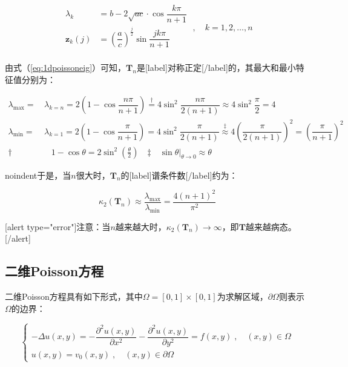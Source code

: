 \documentclass[12pt, UTF8, nofonts]{ctexart}
\begin{document}
\begin{equation*}
    \begin{aligned}
        \lambda_k &= b-2\sqrt{ac} \cdot \cos\dfrac{k\pi}{n+1} \\
        \boldsymbol{z}_k(j) &= \left(\dfrac{a}{c}\right)^{\frac{j}{2}}
        \sin\dfrac{jk\pi}{n+1} \\
    \end{aligned} \; , \quad
    k=1,2,\ldots,n
\end{equation*}

由式（\ref{eq:1dpoissoneig}）可知，$\boldsymbol{T}_n$是[label]对称正定[/label]的，其最大和最小特征值分别为：

\begin{equation*}
    \begin{aligned}
        \lambda_{\max} =&\, \lambda_{k=n} =
        2\left(1-\cos\dfrac{n\pi}{n+1}\right) \overset{\dagger}{=}
        4\sin^2\dfrac{n\pi}{2(n+1)} \approx 4\sin^2\dfrac{\pi}{2} = 4 \\
        \lambda_{\min} =&\, \lambda_{k=1} =
        2\left(1-\cos\dfrac{\pi}{n+1}\right) = 4\sin^2\dfrac{\pi}{2(n+1)}
        \overset{\ddagger}{\approx} 4\left(\dfrac{\pi}{2(n+1)}\right)^2 =
        \left(\dfrac{\pi}{n+1}\right)^2 \\
        \boldsymbol{\dagger} & \quad 1-\cos\theta = 2\sin^2\left(\frac{\theta}{2}\right)
        \quad \boldsymbol{\ddagger} \quad \left.\sin\theta\right|_{\theta \to 0} \approx \theta
    \end{aligned}
\end{equation*}

noindent于是，当$n$很大时，$\boldsymbol{T}_n$的[label]谱条件数[/label]约为：

\begin{equation}
    \kappa_2(\boldsymbol{T}_n) \approx \dfrac{\lambda_{\max}}{\lambda_{\min}}
    = \dfrac{4(n+1)^2}{\pi^2}
\end{equation}

[alert type="error"]注意：当$n$越来越大时，$\kappa_2(\boldsymbol{T}_n)\to\infty$，即$\boldsymbol{T}$越来越病态。[/alert]

\subsection*{二维Poisson方程}

二维Poisson方程具有如下形式，其中$\Omega=[0,1]\times[0,1]$为求解区域，$\partial\Omega$则表示$\Omega$的边界：

\begin{equation}
    \label{eq:2dpoisson}
    \begin{cases}
        -\Delta u(x,y) = -\dfrac{\partial^2u(x,y)}{\partial x^2} -
        \dfrac{\partial^2u(x,y)}{\partial y^2} = f(x,y) \;,\quad
        (x,y) \in \Omega \\
        u(x,y) = v_0(x,y) \;, \quad (x,y) \in \partial\Omega
    \end{cases}
\end{equation}
\end{document}
